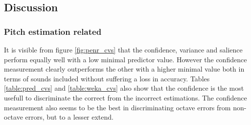 \documentclass{proc}
\begin{document}
\subsection{Discussion}
\subsubsection{Pitch estimation related}
It is visible from figure \ref{fig:penr_cvs}  that the confidence, variance and salience perform equally well with a low minimal predictor value. However the confidence measurement clearly outperforms the other with a higher minimal value both in terms of sounds included without suffering a loss in accuracy. Tables \ref{table:pred_cvs} and \ref{table:weka_cvs} also show that the confidence is the most usefull to discriminate the correct from the incorrect estimations. 
The confidence measurement also seems to be the best in discriminating octave errors from non-octave errors, but to a lesser extend.
\end{document}
